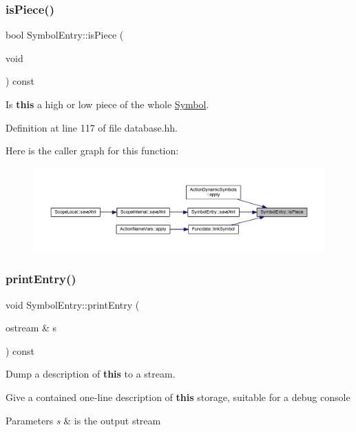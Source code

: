 \subsubsection{\texorpdfstring{isPiece()}{isPiece()}}
{\footnotesize\ttfamily bool Symbol\+Entry\+::is\+Piece (\begin{DoxyParamCaption}\item[{void}]{ }\end{DoxyParamCaption}) const\hspace{0.3cm}{\ttfamily [inline]}}



Is {\bfseries{this}} a high or low piece of the whole \mbox{\hyperlink{class_symbol}{Symbol}}. 



Definition at line 117 of file database.\+hh.

Here is the caller graph for this function\+:
\nopagebreak
\begin{figure}[H]
\begin{center}
\leavevmode
\includegraphics[width=350pt]{class_symbol_entry_a13c0e084b4c66443250ecf145f43d2e2_icgraph}
\end{center}
\end{figure}
\mbox{\label{class_symbol_entry_a0d46ff3d3aef03da78bd7dfd595bd852}} 
\subsubsection{\texorpdfstring{printEntry()}{printEntry()}}
{\footnotesize\ttfamily void Symbol\+Entry\+::print\+Entry (\begin{DoxyParamCaption}\item[{ostream \&}]{s }\end{DoxyParamCaption}) const}



Dump a description of {\bfseries{this}} to a stream. 

Give a contained one-\/line description of {\bfseries{this}} storage, suitable for a debug console 
\begin{DoxyParams}{Parameters}
{\em s} & is the output stream \\
\hline
\end{DoxyParams}



